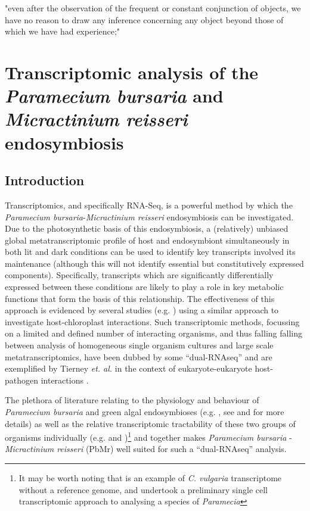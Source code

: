 \graphicspath{{chapters/4.Chapter_2/figures}}

\begin{savequote}[75mm]
"even after the observation of the frequent or constant conjunction of objects, we have no reason to draw any inference concerning any object beyond those of which we have had experience;"
\end{savequote}


\chapter{Transcriptomic analysis of the \textit{Paramecium bursaria} and \textit{Micractinium reisseri} endosymbiosis}

\section{Introduction}

Transcriptomics, and specifically RNA-Seq, is a powerful method by which the \textit{Paramecium bursaria}-\textit{Micractinium reisseri}
endosymbiosis can be investigated. Due to the photosynthetic basis of this endosymbiosis, a (relatively) unbiased
global metatranscriptomic profile of host and endosymbiont simultaneously in both lit and dark conditions can be used
to identify key transcripts involved its maintenance (although this will not identify essential but constitutively expressed
components). Specifically, transcripts which are significantly differentially expressed
between these conditions are likely to play a role in key metabolic functions that form the basis of this relationship.
The effectiveness of this approach is evidenced by several studies (e.g. \citep{Nowack2011,Jiggins2013,Xiang2015}) using a similar approach
to investigate host-chloroplast interactions. Such transcriptomic methods, focussing on a limited and defined number of interacting organisms, and thus falling 
falling between analysis of homogeneous single organism cultures and
large scale metatranscriptomics, have been dubbed by some ``dual-RNAseq'' \citep{Westermann2012} and are exemplified by Tierney \textit{et. al.} in the context 
of eukaryote-eukaryote host-pathogen interactions \citep{Tieryney2012}.

The plethora of literature relating to the physiology and behaviour of \textit{Paramecium bursaria} and green algal endosymbioses (e.g. \citep{Iwatsuki1988}, 
    see \citep{Kato2009a} and  for more details) as well as the relative transcriptomic tractability of these two groups of 
    organisms individually (e.g. \citep{Guarnieri2011,Rowe2014,Bashan2015} and \citep{Arnaiz2010,Kolisko2014})\footnote{It may be worth noting
        that \citep{Guarnieri2011} is an example of \textit{C. vulgaria} transcriptome without a reference genome, and \citep{Kolisko2014} undertook
    a preliminary single cell transcriptomic approach to analysing a species of \textit{Paramecia}}
and together \citep{Kodama2014} makes \textit{Paramecium bursaria} - \textit{Micractinium reisseri} (PbMr)
well suited for such a ``dual-RNAseq'' analysis.  

